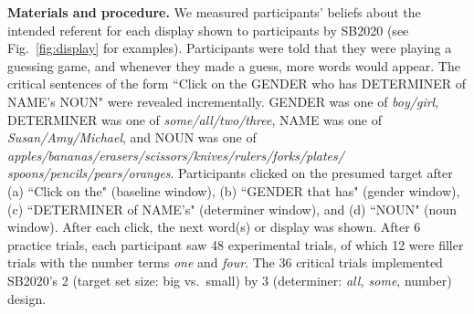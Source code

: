 \documentclass[10pt,letterpaper]{article}
\newcommand{\figref}[1]{Fig.~\ref{#1}}
\begin{document}
\textbf{Materials and procedure.} We measured participants' beliefs about the intended referent for each display shown to participants by SB2020 (see \figref{fig:display} for examples). Participants were told that they were playing a guessing game, and whenever they made a guess, more words would appear. The critical sentences of the form ``Click on the GENDER who has DETERMINER  of NAME's NOUN" were revealed incrementally. GENDER was one of \emph{boy/girl}, DETERMINER was one of \emph{some/all/two/three}, NAME was one of \emph{Susan/Amy/Michael}, and NOUN was one of \emph{apples/bananas/erasers/scissors/knives/rulers/forks/plates/
spoons/pencils/pears/oranges}.  Participants clicked on the presumed target after (a) ``Click on the" (baseline window), (b) ``GENDER that has" (gender window), (c) ``DETERMINER of NAME's" (determiner window), and (d) ``NOUN" (noun window). After each click, the next word(s) or display was shown. After 6 practice trials, each participant saw 48 experimental trials, of which 12 were filler trials with the number terms \emph{one} and \emph{four}. The 36 critical trials implemented SB2020's 2 (target set size: big vs.~small) by 3 (determiner: \emph{all, some}, number) design. 
\end{document}
